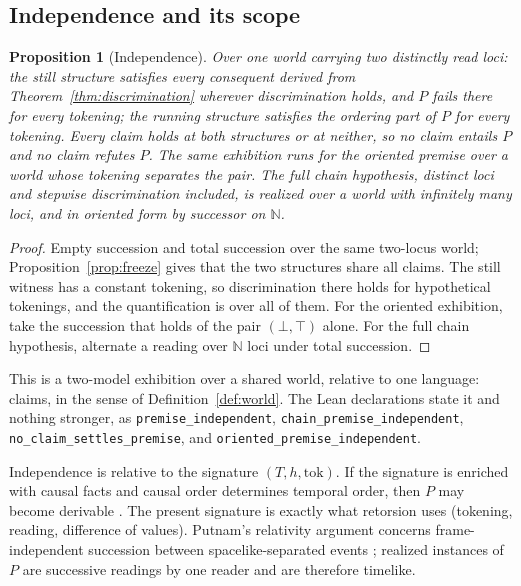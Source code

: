 \documentclass[11pt]{article}
\newtheorem{proposition}[theorem]{Proposition}
\newcommand{\lf}[1]{\texttt{#1}}
\begin{document}
\subsection{Independence and its scope}
\label{sec:indep}

\begin{proposition}[Independence]
\label{prop:independence}
Over one world carrying two distinctly read loci: the still structure satisfies every consequent derived from Theorem~\ref{thm:discrimination} wherever discrimination holds, and $P$ fails there for every tokening; the running structure satisfies the ordering part of $P$ for every tokening. Every claim holds at both structures or at neither, so no claim entails $P$ and no claim refutes $P$. The same exhibition runs for the oriented premise over a world whose tokening separates the pair. The full chain hypothesis, distinct loci and stepwise discrimination included, is realized over a world with infinitely many loci, and in oriented form by successor on $\mathbb{N}$.
\end{proposition}

\begin{proof}
Empty succession and total succession over the same two-locus world; Proposition~\ref{prop:freeze} gives that the two structures share all claims. The still witness has a constant tokening, so discrimination there holds for hypothetical tokenings, and the quantification is over all of them. For the oriented exhibition, take the succession that holds of the pair $(\bot,\top)$ alone. For the full chain hypothesis, alternate a reading over $\mathbb{N}$ loci under total succession.
\end{proof}

This is a two-model exhibition over a shared world, relative to one language: claims, in the sense of Definition~\ref{def:world}. The Lean declarations state it and nothing stronger, as \lf{premise\_independent}, \lf{chain\_premise\_independent}, \lf{no\_claim\_settles\_premise}, and \lf{oriented\_premise\_independent}.

Independence is relative to the signature $(T, h, \mathrm{tok})$. If the signature is enriched with causal facts and causal order determines temporal order, then $P$ may become derivable \cite{mellor1998}. The present signature is exactly what retorsion uses (tokening, reading, difference of values). Putnam's relativity argument concerns frame-independent succession between spacelike-separated events \cite{putnam1967}; realized instances of $P$ are successive readings by one reader and are therefore timelike.
\end{document}
